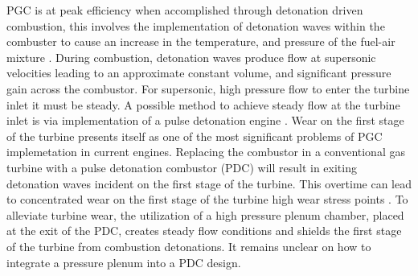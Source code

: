 PGC is at peak efficiency when accomplished through detonation driven combustion, this involves the implementation of detonation waves within the combuster to cause an increase in the temperature, and pressure of the fuel-air mixture \cite{eidelman1991}. During combustion, detonation waves produce flow at supersonic velocities leading to an approximate constant volume, and significant pressure gain across the combustor. For supersonic, high pressure flow to enter the turbine inlet it must be steady. A possible method to achieve steady flow at the turbine inlet is via implementation of a pulse detonation engine \cite{kailasanath2009}. 
Wear on the first stage of the turbine presents itself as one of the most significant problems of PGC implemetation in current engines. Replacing the combustor in a conventional gas turbine with a pulse detonation combustor (PDC) will result in exiting detonation waves incident on the first stage of the turbine. This overtime can lead to concentrated wear on the first stage of the turbine high wear stress points \cite{dean2005}. 
To alleviate turbine wear, the utilization of a high pressure plenum chamber, placed at the exit of the PDC, creates steady flow conditions and shields the first stage of the turbine from combustion detonations. It remains unclear on how to integrate a pressure plenum into a PDC design. 

